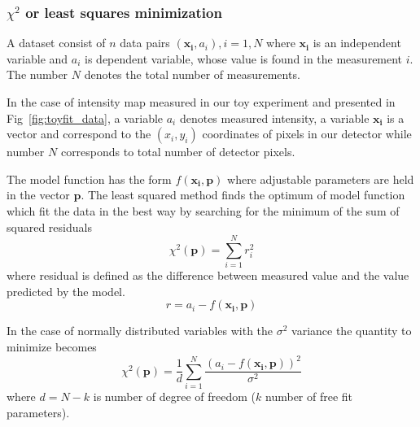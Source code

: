 \subsubsection*{$\chi^2$ or least squares minimization}
A dataset consist of $n$ data pairs $(\mathbf{x_{i}}, a_{i}), i=1,N$ where 
$\mathbf{x_{i}}$ is an independent variable and $a_{i}$ is dependent variable, whose
value is found in the measurement $i$. The number $N$ denotes the total
number of measurements. 

In the case of intensity map measured in our toy experiment 
and presented in Fig~\ref{fig:toyfit_data}, a variable $a_{i}$ denotes measured intensity, a variable $\mathbf{x_{i}}$ is a vector and correspond to the 
$(x_{i}, y_{i})$ coordinates of pixels in our detector while number $N$  corresponds 
to total number of detector pixels.

The model function has the form
$f(\mathbf{x_{i}},\mathbf{p})$
where adjustable parameters are held in the vector $\mathbf{p}$.
The least squared method finds the optimum of model function which 
fit the data in the best way by searching for the minimum of the sum of squared
residuals
$$ \chi^{2}(\mathbf{p}) = \sum_{i=1}^{N}r_{i}^{2}$$
where residual is defined as the difference between measured value and the value predicted by the model.
$$r = a_{i} - f(\mathbf{x_{i}},\mathbf{p})$$

In the case of normally distributed variables with the $\sigma^2$ variance
the quantity to minimize becomes
$$ \chi^{2}(\mathbf{p}) =
\frac{1}{d}
\sum_{i=1}^{N}  
\frac{ (a_{i} - f(\mathbf{x_{i}},\mathbf{p}))^2}{\sigma^2}   $$
where $d=N-k$ is number of degree of freedom ($k$ number of free fit parameters).

